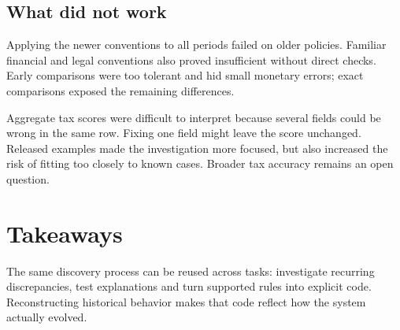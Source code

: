 \documentclass[10pt,a4paper]{article}
\begin{document}
\subsection{What did not work}
Applying the newer conventions to all periods failed on older policies. Familiar financial and legal conventions also proved insufficient without direct checks. Early comparisons were too tolerant and hid small monetary errors; exact comparisons exposed the remaining differences.

Aggregate tax scores were difficult to interpret because several fields could be wrong in the same row. Fixing one field might leave the score unchanged. Released examples made the investigation more focused, but also increased the risk of fitting too closely to known cases. Broader tax accuracy remains an open question.

\section{Takeaways}
The same discovery process can be reused across tasks: investigate recurring discrepancies, test explanations and turn supported rules into explicit code. Reconstructing historical behavior makes that code reflect how the system actually evolved.
\end{document}
